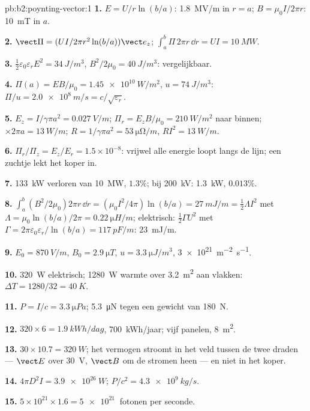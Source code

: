 \begin{solution}{pb:b2:poynting-vector:1}
\textbf{1.} $E = U/r\ln(b/a)$: \qty{1.8}{MV/m} in $r = a$;
$B = \mu_0I/2\pi r$: \qty{10}{mT} in $a$.

\textbf{2.} $\vect\Pi = (UI/2\pi r^2\ln(b/a))\vect e_z$;
$\int_a^b\Pi\,2\pi r\,\dd r = UI =
\qty{10}{MW}$.

\textbf{3.} $\tfrac12\varepsilon_0\varepsilon_rE^2 = \qty{34}{J/m^3}$,
$B^2/2\mu_0 = \qty{40}{J/m^3}$: vergelijkbaar.

\textbf{4.} $\Pi(a) = EB/\mu_0 = \qty{1.45e10}{W/m^2}$,
$u = \qty{74}{J/m^3}$: $\Pi/u =
\qty{2.0e8}{m/s} = c/\sqrt{\varepsilon_r}$.

\textbf{5.} $E_z = I/\gamma\pi a^2 = \qty{0.027}{V/m}$;
$\Pi_r = E_zB/\mu_0 = \qty{210}{W/m^2}$ naar binnen;
$\times2\pi a = \qty{13}{W/m}$;
$R = 1/\gamma\pi a^2 = \qty{53}{\micro\ohm/m}$, $RI^2 =
\qty{13}{W/m}$.

\textbf{6.} $\Pi_r/\Pi_z = E_z/E_r = 1.5 \times 10^{-8}$: vrijwel alle
energie loopt langs de lijn; een zuchtje lekt het koper in.

\textbf{7.} \qty{133}{kW} verloren van \qty{10}{MW}, $1.3\%$; bij
\qty{200}{kV}: \qty{1.3}{kW}, $0.013\%$.

\textbf{8.}
$\int_a^b(B^2/2\mu_0)2\pi r\,\dd r = (\mu_0I^2/4\pi)\ln(b/a) = \qty{27}{mJ/m} =
\tfrac12\Lambda I^2$
met $\Lambda = \mu_0\ln(b/a)/2\pi = \qty{0.22}{\micro H/m}$; elektrisch:
$\tfrac12\Gamma U^2$ met
$\Gamma = 2\pi\varepsilon_0\varepsilon_r/\ln(b/a) = \qty{117}{pF/m}$:
\qty{23}{mJ/m}.

\textbf{9.} $E_0 = \qty{870}{V/m}$, $B_0 = \qty{2.9}{\micro T}$,
$u = \qty{3.3}{\micro J/m^3}$, \qty{3e21}{m^{-2}.s^{-1}}.

\textbf{10.} \qty{320}{W} elektrisch; \qty{1280}{W} warmte over
\qty{3.2}{m^2} aan vlakken: $\Delta T = 1280/32 = \qty{40}{K}$.

\textbf{11.} $P = I/c = \qty{3.3}{\micro Pa}$; \qty{5.3}{\micro N} tegen een
gewicht van \qty{180}{N}.

\textbf{12.} $320 \times 6 = \qty{1.9}{kWh/dag}$, \qty{700}{kWh/jaar}; vijf
panelen, \qty{8}{m^2}.

\textbf{13.} $30 \times 10.7 = \qty{320}{W}$; het vermogen stroomt in het
veld tussen de twee draden --- $\vect E$ over \qty{30}{V}, $\vect B$ om de
stromen heen --- en niet in het koper.

\textbf{14.} $4\pi D^2I = \qty{3.9e26}{W}$; $P/c^2 = \qty{4.3e9}{kg/s}$.

\textbf{15.} $5 \times 10^{21} \times 1.6 = \qty{5e21}{}$ fotonen per seconde.


\end{solution}
